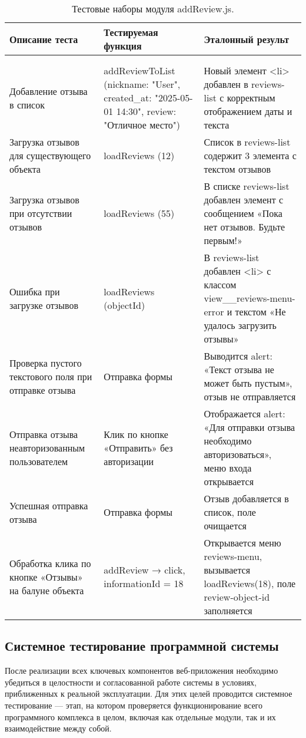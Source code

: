 \begin{xltabular}{\textwidth}{|X|p{4cm}|X|}
	\caption{Тестовые наборы модуля addReview.js.\label{class:mtable3}}\\
	\hline \centrow Описание теста & \centrow Тестируемая функция & \centrow Эталонный результ\\
	\hline {} &  & \\ \hline
	\endfirsthead
	 &  & \\ \hline
	\finishhead
	Добавление отзыва в список & addReviewToList (nickname: "User", created\_at: "2025-05-01 14:30", review: "Отличное место") & Новый элемент <li> добавлен в reviews-list с корректным отображением даты и текста\\
	\hline Загрузка отзывов для существующего объекта & loadReviews (12) & Список в reviews-list содержит 3 элемента с текстом отзывов\\
	\hline Загрузка отзывов при отсутствии отзывов & loadReviews (55) & В списке reviews-list добавлен элемент с сообщением «Пока нет отзывов. Будьте первым!»\\
	\hline Ошибка при загрузке отзывов & loadReviews (objectId) & В reviews-list добавлен <li> с классом view\_\_reviews-menu-error и текстом «Не удалось загрузить отзывы»\\
	\hline Проверка пустого текстового поля при отправке отзыва & Отправка формы & Выводится alert: «Текст отзыва не может быть пустым», отзыв не отправляется\\
	\hline Отправка отзыва неавторизованным пользователем & Клик по кнопке «Отправить» без авторизации & Отображается alert: «Для отправки отзыва необходимо авторизоваться», меню входа открывается\\
	\hline Успешная отправка отзыва & Отправка формы & Отзыв добавляется в список, поле очищается\\
	\hline Обработка клика по кнопке «Отзывы» на балуне объекта & addReview → click, informationId = 18 & Открывается меню reviews-menu, вызывается loadReviews(18), поле review-object-id заполняется\\
\end{xltabular}

\subsection{Системное тестирование программной системы}

После реализации всех ключевых компонентов веб-приложения необходимо убедиться в целостности и согласованной работе системы в условиях, приближенных к реальной эксплуатации\cite{b28}. Для этих целей проводится системное тестирование — этап, на котором проверяется функционирование всего программного комплекса в целом, включая как отдельные модули, так и их взаимодействие между собой.

